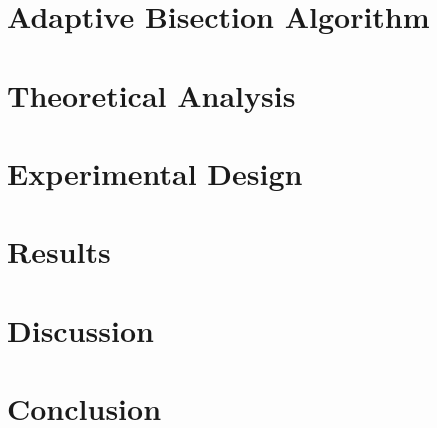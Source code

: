 \documentclass[12pt]{article}
\begin{document}
\section{Adaptive Bisection Algorithm}


\section{Theoretical Analysis}


\section{Experimental Design}


\section{Results}
\label{sec:results}


\section{Discussion}


\section{Conclusion}




\end{document}
